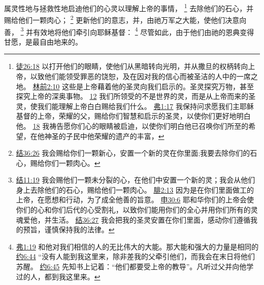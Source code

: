 \documentclass[12pt, a4paper, oneside]{ctexart}
\begin{document}
	属灵性地与拯救性地启迪他们的心灵以理解上帝的事情，
	\footnote {
		\href{https://biblehub.com/acts/26-18.htm}{徒26:18} 以打开他们的眼睛，使他们从黑暗转向光明，并从撒旦的权柄转向上帝，以致他们能领受罪恶的饶恕，及在因对我的信心而被圣洁的人中的一席之地。
		\href{https://biblehub.com/1_corinthians/2-10.htm}{林前2:10} 这些是上帝藉着他的圣灵向我们启示的。圣灵探究万物，甚至探究上帝的深奥事物。 
		\href{https://biblehub.com/1_corinthians/2-12.htm}{12} 我们所领受的不是世界的灵，而是从上帝而来的圣灵，使我们能理解上帝白白赐给我们什么。 
		\href{https://biblehub.com/ephesians/1-17.htm}{弗1:17} 我保持问求愿我们主耶稣基督的上帝，荣耀的父，赐给你们智慧和启示的圣灵，以使你们更好地明白他。
		\href{https://biblehub.com/ephesians/1-18.htm}{18} 我祷告愿你们心的眼睛被启迪，以使你们明白他已召唤你们所至的希望，在他神圣的子民中他荣耀的遗产的丰富，
	}
	去除他们的石心，并赐给他们一颗肉心；
	\footnote {
		\href{https://biblehub.com/ezekiel/36-26.htm}{结36:26} 我会赐给你们一颗新心，安置一个新的灵在你里面;我要去除你们的石心，赐给你们一颗肉心。
	}
	更新他们的意志，并，由祂万军之大能，使他们决意向善，
	\footnote {
		\href{https://biblehub.com/ezekiel/11-19.htm}{结11:19} 我会赐他们一颗未分裂的心，在他们中安置一个新的灵；我会从他们身上去除他们的石心，赐给他们一颗肉心。
		\href{https://biblehub.com/philippians/2-13.htm}{腓2:13} 因为是在你们里面做工的上帝，在愿想和行动，为了成全他善的旨意。
		\href{https://biblehub.com/deuteronomy/30-6.htm}{申30:6} 耶和华你们的上帝会使你们的心和你们后代的心受割礼，以致你们能用你们的全心并用你们所有的灵魂爱他，并生活。
		\href{https://biblehub.com/ezekiel/36-27.htm}{结36:27} 我会把我的圣灵安置在你们里面，感动你们遵循我的预旨，谨慎保持我的法律。
	}
	并有效地将他们牵引向耶稣基督：
	\footnote {
		\href{https://biblehub.com/ephesians/1-19.htm}{弗1:19} 和他对我们相信的人的无比伟大的大能。那大能和强大的力量是相同的
		\href{https://biblehub.com/john/6-44.htm}{约6:44} “没有人能到我这里来，除非差我的父牵引他们，而我会在末日将他们苏醒。
		\href{https://biblehub.com/john/6-45.htm}{约6:45} 先知书上记着：“他们都要受上帝的教导”。凡听过父并向他学过的人，都到我这里来。
	}
	尽管如此，由于他们由祂的恩典变得甘愿，是最自由地来的。
\end{document}
